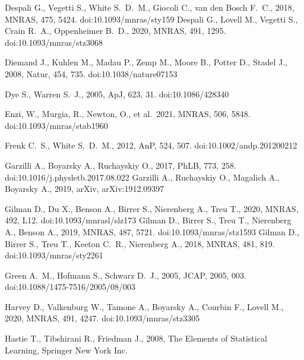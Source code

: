 \documentclass[a4paper, fleqn, usenatbib, useAMS]{mnras}
\def\mnras{MNRAS}
\begin{document}
\begin{thebibliography}{99}
 Despali G., Vegetti S., White S.~D.~M., Giocoli C., van den Bosch F.~C., 2018, MNRAS, 475, 5424. doi:10.1093/mnras/sty159
 Despali G., Lovell M., Vegetti S., Crain R.~A., Oppenheimer B.~D., 2020, MNRAS, 491, 1295. doi:10.1093/mnras/stz3068


 Diemand J., Kuhlen M., Madau P., Zemp M., Moore B., Potter D., Stadel J., 2008, Natur, 454, 735. doi:10.1038/nature07153


 Dye S., Warren S.~J., 2005, ApJ, 623, 31. doi:10.1086/428340

 Enzi, W., Murgia, R.,
  Newton, O., et al.\ 2021, \mnras, 506,
  5848. doi:10.1093/mnras/stab1960

 Frenk C.~S., White S.~D.~M., 2012, AnP, 524, 507. doi:10.1002/andp.201200212

 Garzilli A., Boyarsky A., Ruchayskiy O., 2017, PhLB, 773, 258. doi:10.1016/j.physletb.2017.08.022
 Garzilli A., Ruchayskiy O., Magalich A., Boyarsky A., 2019, arXiv, arXiv:1912.09397


 Gilman D., Du X., Benson A., Birrer S., Nierenberg A., Treu T., 2020, MNRAS, 492, L12. doi:10.1093/mnrasl/slz173
 Gilman D., Birrer S., Treu T., Nierenberg A., Benson A., 2019, MNRAS, 487, 5721. doi:10.1093/mnras/stz1593
 Gilman D., Birrer S., Treu T., Keeton C.~R., Nierenberg A., 2018, MNRAS, 481, 819. doi:10.1093/mnras/sty2261

 Green A.~M., Hofmann S., Schwarz D.~J., 2005, JCAP, 2005, 003. doi:10.1088/1475-7516/2005/08/003

 Harvey D., Valkenburg W., Tamone A., Boyarsky A., Courbin F., Lovell M., 2020, MNRAS, 491, 4247. doi:10.1093/mnras/stz3305

Hastie T., Tibshirani R., Friedman J., 2008, The Elements of Statistical Learning, Springer New York Inc.


\end{thebibliography}
\end{document}
